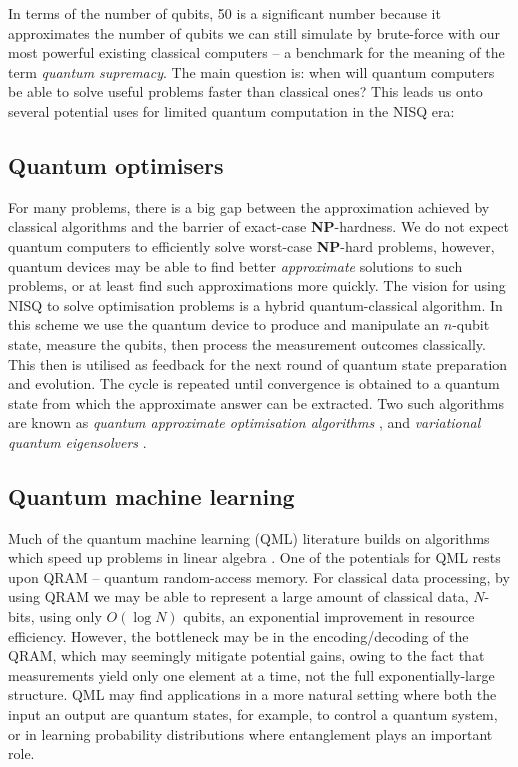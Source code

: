 In terms of the number of qubits, 50 is a significant number because it approximates the number of qubits we can still simulate by brute-force with our most powerful existing classical computers \cite{bib:boixo2018characterizing} -- a benchmark for the meaning of the term \textit{quantum supremacy}. The main question is: when will quantum computers be able to solve useful problems faster than classical ones? This leads us onto several potential uses for limited quantum computation in the NISQ era:

\subsection{Quantum optimisers}

For many problems, there is a big gap between the approximation achieved by classical algorithms and the barrier of exact-case \textbf{NP}-hardness. We do not expect quantum computers to efficiently solve worst-case \textbf{NP}-hard problems, however, quantum devices may be able to find better \textit{approximate} solutions to such problems, or at least find such approximations more quickly. The vision for using NISQ to solve optimisation problems is a hybrid quantum-classical algorithm. In this scheme we use the quantum device to produce and manipulate an $n$-qubit state, measure the qubits, then process the measurement outcomes classically. This then is utilised as feedback for the next round of quantum state preparation and evolution. The cycle is repeated until convergence is obtained to a quantum state from which the approximate answer can be extracted. Two such algorithms are known as \textit{quantum approximate optimisation algorithms} \cite{bib:farhi2014quantum}, and \textit{variational quantum eigensolvers} \cite{bib:mcclean2016theory}.

\subsection{Quantum machine learning}

Much of the quantum machine learning (QML) literature builds on algorithms which speed up problems in linear algebra \cite{bib:biamonte2017quantum}. One of the potentials for QML rests upon QRAM -- quantum random-access memory. For classical data processing, by using QRAM we may be able to represent a large amount of classical data, $N$-bits, using only $O(\log N)$ qubits, an exponential improvement in resource efficiency. However, the bottleneck may be in the encoding/decoding of the QRAM, which may seemingly mitigate potential gains, owing to the fact that measurements yield only one element at a time, not the full exponentially-large structure. QML may find applications in a more natural setting where both the input an output are quantum states, for example, to control a quantum system, or in learning probability distributions where entanglement plays an important role.

